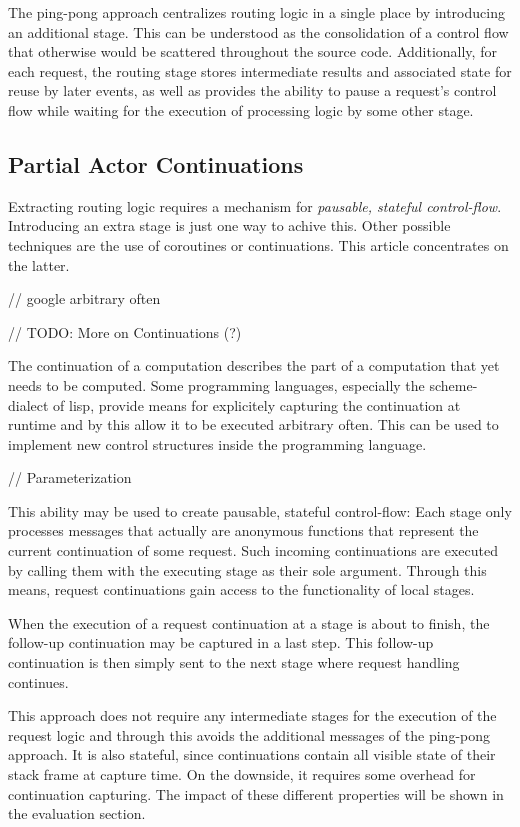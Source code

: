 \documentclass{sig-alternate}
\begin{document}
The ping-pong approach centralizes routing logic in a single place by introducing an additional
stage. This can be understood as the consolidation of a control flow that otherwise would be
scattered throughout the source code. Additionally, for each request, the routing stage stores
intermediate results and associated state for reuse by later events, as well as provides the ability
to pause a request's control flow while waiting for the execution of processing logic by some other
stage.



\subsection{Partial Actor Continuations}

Extracting routing logic requires a mechanism for \emph{pausable, stateful control-flow}.
Introducing an extra stage is just one way to achive this. Other possible techniques are the use of
coroutines or continuations. This article concentrates on the latter.
                                                
// google arbitrary often

// TODO: More on Continuations (?)

The continuation of a computation describes the part of a computation that yet needs to be computed.
Some programming languages, especially the scheme-dialect of lisp, provide means for explicitely
capturing the continuation at runtime and by this allow it to be executed arbitrary often.  This
can be used to implement new control structures inside the programming language.  
                                
// Parameterization

This ability may be used to create pausable, stateful control-flow: Each stage only processes
messages that actually are anonymous functions that represent the current continuation of some
request. Such incoming continuations are executed by calling them with the executing stage as their
sole argument. Through this means, request continuations gain access to the functionality of local
stages.

When the execution of a request continuation at a stage is about to finish, the follow-up 
continuation may be captured in a last step.  This follow-up continuation is then simply sent
to the next stage where request handling continues.  

This approach does not require any intermediate stages for the execution of the request logic and
through this avoids the additional messages of the ping-pong approach. It is also stateful, since
continuations contain all visible state of their stack frame at capture time. On the downside, it
requires some overhead for continuation capturing. The impact of these different properties will be
shown in the evaluation section.
\end{document}
